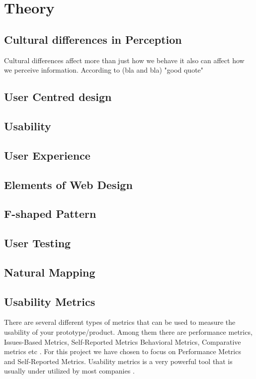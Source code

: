 
\chapter{Theory} %

\label{Chapter1} %




\section{Cultural differences in Perception}
Cultural differences affect more than just how we behave it also can affect how we perceive information. According to (bla and bla) "good quote" \cite{Holistic_vs_Analytic}
\section{User Centred design}
\section{Usability}
\section{User Experience}
\section{Elements of Web Design}
\section{F-shaped Pattern}
\section{User Testing}
\section{Natural Mapping}
\section{Usability Metrics}
There are several different types of metrics that can be used to measure the usability of your prototype/product. Among them there are performance metrics, Issues-Based Metrics, Self-Reported Metrics Behavioral Metrics, Comparative metrics etc \cite{tullis_albert_2011}. For this project we have chosen to focus on Performance Metrics and Self-Reported Metrics. Usability metrics is a very powerful tool that is usually under utilized by most companies \cite{norman_metrics}. 
